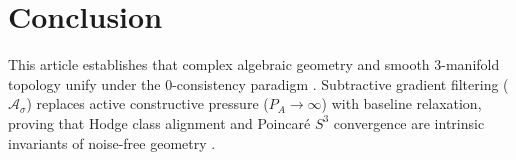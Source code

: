 \documentclass[11pt,a4paper]{article}
\begin{document}
\section{Conclusion}
This article establishes that complex algebraic geometry and smooth 3-manifold topology unify under the $0$-consistency paradigm \cite{nicht_theory_monograph, nicht_metaphysics_paper_0}. Subtractive gradient filtering ($\mathcal{A}_\sigma$) replaces active constructive pressure ($P_A \to \infty$) with baseline relaxation, proving that Hodge class alignment \cite{hodge1950topological} and Poincaré $S^3$ convergence \cite{poincare1904cinquieme, perelman2002entropy} are intrinsic invariants of noise-free geometry \cite{nicht_metaphysics_paper_1, nicht_metaphysics_paper_2, apophatic_opt_pypi}.

\clearpage


\end{document}
